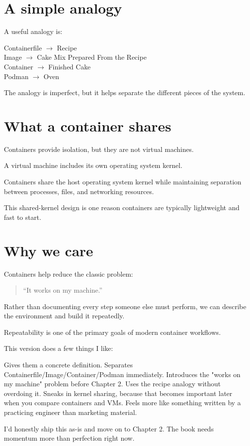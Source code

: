 \section{A simple analogy}

A useful analogy is:

\begin{center}
Containerfile $\rightarrow$ Recipe \\
Image $\rightarrow$ Cake Mix Prepared From the Recipe \\
Container $\rightarrow$ Finished Cake \\
Podman $\rightarrow$ Oven
\end{center}

The analogy is imperfect, but it helps separate the different pieces of the system.

\section{What a container shares}

Containers provide isolation, but they are not virtual machines.

A virtual machine includes its own operating system kernel.

Containers share the host operating system kernel while maintaining separation between processes, files, and networking resources.

This shared-kernel design is one reason containers are typically lightweight and fast to start.

\section{Why we care}

Containers help reduce the classic problem:

\begin{quote}
``It works on my machine.''
\end{quote}

Rather than documenting every step someone else must perform, we can describe the environment and build it repeatedly.

Repeatability is one of the primary goals of modern container workflows.



This version does a few things I like:

Gives them a concrete definition.
Separates Containerfile/Image/Container/Podman immediately.
Introduces the "works on my machine" problem before Chapter 2.
Uses the recipe analogy without overdoing it.
Sneaks in kernel sharing, because that becomes important later when you compare containers and VMs.
Feels more like something written by a practicing engineer than marketing material.

I'd honestly ship this as-is and move on to Chapter 2. The book needs momentum more than perfection right now. 